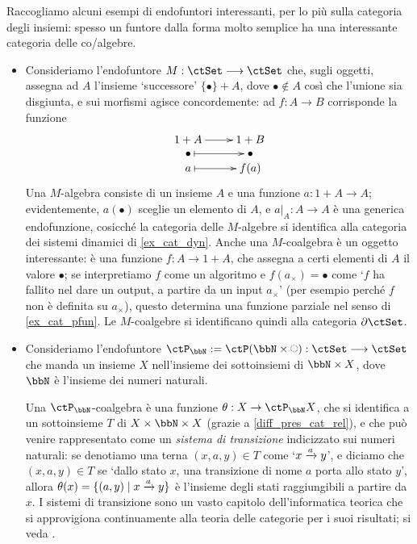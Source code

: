 \begin{examples}
	Raccogliamo alcuni esempi di endofuntori interessanti, per lo più sulla categoria degli insiemi: spesso un funtore dalla forma molto semplice ha una interessante categoria delle co/algebre.
	\begin{itemize}
		\item Consideriamo l'endofuntore \(M : \ctSet\fun\ctSet\) che, sugli oggetti, assegna ad \(A\) l'insieme `successore' \(\{\bullet\}+A\), dove \(\bullet\notin A\) così che l'unione sia disgiunta, e sui morfismi agisce concordemente: ad \(f : A\to B\) corrisponde la funzione
		      \[\xymatrix@R=0mm{
			      1+A \ar[r] & 1+B \\
			      \bullet \ar@{|->}[r] & \bullet \\
			      a \ar@{|->}[r] & f(a)
			      }\]
		      Una \(M\)-algebra consiste di un insieme \(A\) e una funzione \(a : 1+A\to A\); evidentemente, \(a(\bullet)\) sceglie un elemento di \(A\), e \(a|_A : A\to A\) è una generica endofunzione, cosicché la categoria delle \(M\)-algebre si identifica alla categoria dei sistemi dinamici di \ref{ex_cat_dyn}. Anche una \(M\)-coalgebra è un oggetto interessante: è una funzione \(f : A\to 1+A\), che assegna a certi elementi di \(A\) il valore \(\bullet\); se interpretiamo \(f\) come un algoritmo e \(f(a_\times)=\bullet\) come `\(f\) ha fallito nel dare un output, a partire da un input \(a_\times\)' (per esempio perché \(f\) non è definita su \(a_\times\)), questo determina una funzione parziale nel senso di \ref{ex_cat_pfun}. Le \(M\)-coalgebre si identificano quindi alla categoria \(\pSet\).
		\item Consideriamo l'endofuntore \(\ctP_\bbN:=\ctP(\bbN\times\blank):\ctSet\fun\ctSet\) che manda un insieme \(X\) nell'insieme dei sottoinsiemi di \(\bbN\times X\), dove \(\bbN\) è l'insieme dei numeri naturali.

		      Una \(\ctP_\bbN\)-coalgebra è una funzione \(\theta : X\to \ctP_\bbN X\), che si identifica a un sottoinsieme \(T\) di \(X\times\bbN\times X\) (grazie a \ref{diff_pres_cat_rel}), e che può venire rappresentato come un \emph{sistema di transizione} indicizzato sui numeri naturali: se denotiamo una terna \((x,a,y)\in T\) come `\(x\xrightarrow{a}y\)', e diciamo che \((x,a,y)\in T\) se `dallo stato \(x\), una transizione di nome \(a\) porta allo stato \(y\)', allora \(\theta(x) = \{(a,y)\mid x\xrightarrow{a}y\}\) è l'insieme degli stati raggiungibili a partire da \(x\). I sistemi di transizione sono un vasto capitolo dell'informatica teorica che si approvigiona continuamente alla teoria delle categorie per i suoi risultati; si veda \cite{sangiorgi2011introduction,sangiorgi2012advanced,Jacobs2016}.


\end{itemize}
\end{examples}
